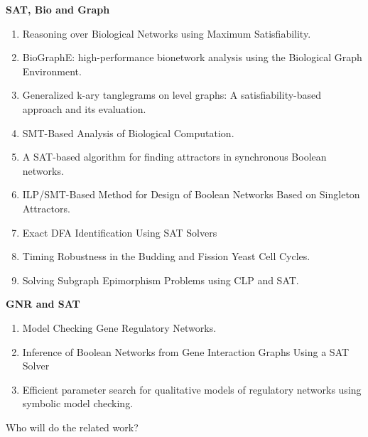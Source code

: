 

\textbf{SAT, Bio and Graph}
\begin{enumerate}
\item Reasoning over Biological Networks using Maximum Satisfiability.
\item BioGraphE: high-performance bionetwork analysis using the Biological Graph Environment.
\item Generalized k-ary tanglegrams on level graphs: A satisfiability-based approach and its evaluation.
\item SMT-Based Analysis of Biological Computation.
\item A SAT-based algorithm for finding attractors in synchronous Boolean networks.
\item ILP/SMT-Based Method for Design of Boolean Networks Based on Singleton Attractors.
\item Exact DFA Identification Using SAT Solvers
\item Timing Robustness in the Budding and Fission Yeast Cell Cycles.
\item Solving Subgraph Epimorphism Problems using CLP
and SAT.
\end{enumerate}

\textbf{GNR and SAT}
\begin{enumerate}
\item Model Checking Gene Regulatory Networks.
\item Inference of Boolean Networks from Gene Interaction Graphs Using a SAT Solver
\item Efficient parameter search for qualitative models of regulatory networks using symbolic model checking.
\end{enumerate}

Who will do the related work?


